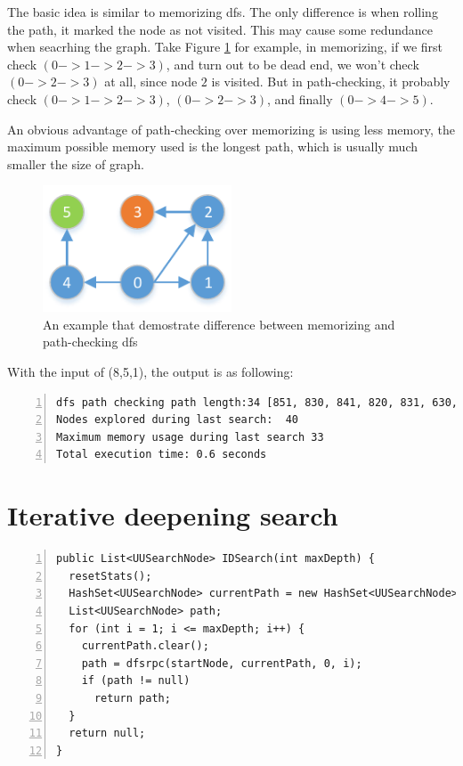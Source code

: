 \documentclass{article}
\begin{document}
The basic idea is similar to memorizing dfs. The only difference is when rolling the path, it marked the node as not visited. This may cause some redundance when seacrhing the graph. Take Figure \ref{diff} for example, in memorizing, if we first check $(0 -> 1 -> 2 -> 3)$, and turn out to be dead end, we won't check $(0 -> 2 -> 3)$ at all, since node $2$ is visited. But in path-checking, it probably check $(0 -> 1 -> 2 -> 3)$, $(0 -> 2 -> 3)$, and finally $(0 -> 4 -> 5)$.

An obvious advantage of path-checking over memorizing is using less memory, the maximum possible memory used is the longest path, which is usually much smaller the size of graph.

\begin{figure}[!h]
\centering
\includegraphics[width=0.5\textwidth]{hw1-fig-2.pdf}
\caption{An example that demostrate difference between memorizing and path-checking dfs}
\label{diff}
\end{figure}

With the input of (8,5,1), the output is as following:

\begin{lstlisting}[numbers=left]
dfs path checking path length:34 [851, 830, 841, 820, 831, 630, 641, 540, 551, 530, 541, 520, 531, 430, 441, 420, 431, 410, 421, 320, 331, 310, 321, 300, 311, 210, 221, 200, 211, 100, 111, 10, 21, 0]
Nodes explored during last search:  40
Maximum memory usage during last search 33
Total execution time: 0.6 seconds
\end{lstlisting}













\section{Iterative deepening search}

\begin{lstlisting}[numbers=left]
public List<UUSearchNode> IDSearch(int maxDepth) {
  resetStats();
  HashSet<UUSearchNode> currentPath = new HashSet<UUSearchNode>();
  List<UUSearchNode> path;
  for (int i = 1; i <= maxDepth; i++) {
    currentPath.clear();
    path = dfsrpc(startNode, currentPath, 0, i);
    if (path != null)
      return path;
  }
  return null;
}
\end{lstlisting}
\end{document}
